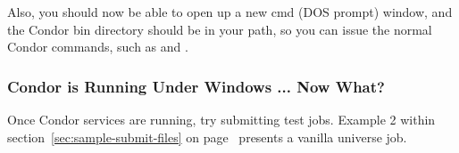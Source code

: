 Also, you should now be able to open up a new cmd (DOS prompt) window, and
the Condor bin directory should be in your path, so you can issue the normal
Condor commands, such as  and .


\subsubsection{\label{nt-running-now-what}
Condor is Running Under Windows ... Now What?}

Once Condor services are running, try submitting test jobs.
Example 2 within section~\ref{sec:sample-submit-files} 
on page~\pageref{sec:sample-submit-files} presents a vanilla
universe job.
